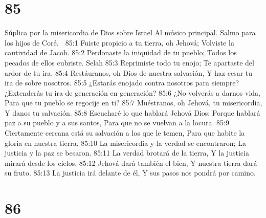 \chapter{85}

Súplica por la misericordia de Dios sobre Israel 
Al músico principal. Salmo para los hijos de Coré. 

85:1 Fuiste propicio a tu tierra, oh Jehová; 
Volviste la cautividad de Jacob. 
85:2 Perdonaste la iniquidad de tu pueblo; 
Todos los pecados de ellos cubriste. Selah 
85:3 Reprimiste todo tu enojo; 
Te apartaste del ardor de tu ira. 
85:4 Restáuranos, oh Dios de nuestra salvación, 
Y haz cesar tu ira de sobre nosotros. 
85:5 ¿Estarás enojado contra nosotros para siempre? 
¿Extenderás tu ira de generación en generación? 
85:6 ¿No volverás a darnos vida, 
Para que tu pueblo se regocije en ti? 
85:7 Muéstranos, oh Jehová, tu misericordia, 
Y danos tu salvación. 
85:8 Escucharé lo que hablará Jehová Dios; 
Porque hablará paz a su pueblo y a sus santos, 
Para que no se vuelvan a la locura. 
85:9 Ciertamente cercana está su salvación a los que le temen, 
Para que habite la gloria en nuestra tierra. 
85:10 La misericordia y la verdad se encontraron; 
La justicia y la paz se besaron. 
85:11 La verdad brotará de la tierra, 
Y la justicia mirará desde los cielos. 
85:12 Jehová dará también el bien, 
Y nuestra tierra dará su fruto. 
85:13 La justicia irá delante de él, 
Y sus pasos nos pondrá por camino. 

\chapter{86}

